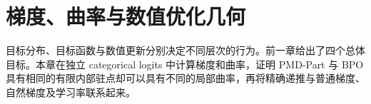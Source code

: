 \chapter{梯度、曲率与数值优化几何}
\label{ch:geometry}
目标分布、目标函数与数值更新分别决定不同层次的行为。前一章给出了四个总体目标。本章在独立 categorical logits 中计算梯度和曲率，证明 PMD-Part 与 BPO 具有相同的有限内部驻点却可以具有不同的局部曲率，再将精确递推与普通梯度、自然梯度及学习率联系起来。


